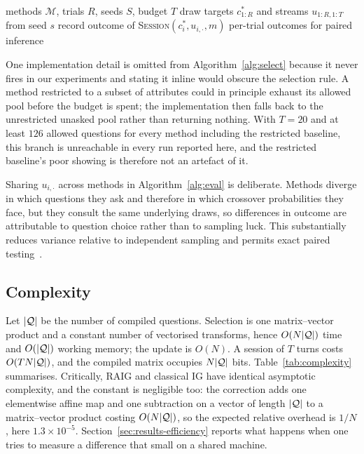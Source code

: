 \begin{algorithm}[t]
\caption{Paired evaluation with common random numbers}
\label{alg:eval}
\begin{algorithmic}[1]
\Require methods $\mathcal{M}$, trials $R$, seeds $S$, budget $T$
  \State draw targets $c^\ast_{1:R}$ and streams $u_{1:R,1:T}$ from seed $s$
      \State record outcome of \textsc{Session}$(c^\ast_i, u_{i,\cdot}, m)$
    \EndFor
  \EndFor
\EndFor
\State \Return per-trial outcomes for paired inference
\end{algorithmic}
\end{algorithm}

One implementation detail is omitted from Algorithm~\ref{alg:select} because it
never fires in our experiments and stating it inline would obscure the
selection rule. A method restricted to a subset of attributes could in
principle exhaust its allowed pool before the budget is spent; the
implementation then falls back to the unrestricted unasked pool rather than
returning nothing. With $T=20$ and at least $126$ allowed questions for every
method including the restricted baseline, this branch is unreachable in every
run reported here, and the restricted baseline's poor showing is therefore not
an artefact of it.

Sharing $u_{i,\cdot}$ across methods in Algorithm~\ref{alg:eval} is deliberate.
Methods diverge in which questions they ask and therefore in which crossover
probabilities they face, but they consult the same underlying draws, so
differences in outcome are attributable to question choice rather than to
sampling luck. This substantially reduces variance relative to independent
sampling and permits exact paired testing~\cite{mcnemar1947}.

\subsection{Complexity}

Let $|\mathcal{Q}|$ be the number of compiled questions. Selection is one
matrix--vector product and a constant number of vectorised transforms, hence
$O(N|\mathcal{Q}|)$ time and $O(|\mathcal{Q}|)$ working memory; the update is $O(N)$. A
session of $T$ turns costs $O(TN|\mathcal{Q}|)$, and the compiled matrix occupies
$N|\mathcal{Q}|$ bits. Table~\ref{tab:complexity} summarises. Critically, RAIG and
classical IG have identical asymptotic complexity, and the constant is
negligible too: the correction adds one elementwise affine map and one
subtraction on a vector of length $|\mathcal{Q}|$ to a matrix--vector product costing
$O(N|\mathcal{Q}|)$, so the expected relative overhead is $1/N$, here
$1.3\times10^{-5}$. Section~\ref{sec:results-efficiency} reports what happens
when one tries to measure a difference that small on a shared machine.

